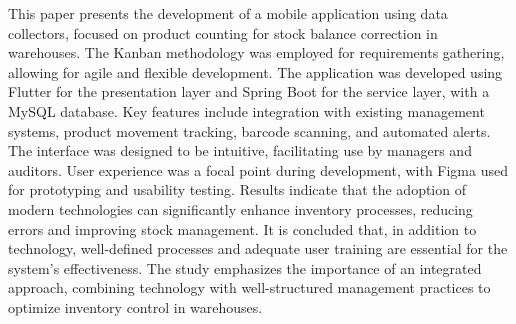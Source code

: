 This paper presents the development of a mobile application using data collectors, focused on product counting for stock balance correction in warehouses. The Kanban methodology was employed for requirements gathering, allowing for agile and flexible development. The application was developed using Flutter for the presentation layer and Spring Boot for the service layer, with a MySQL database. Key features include integration with existing management systems, product movement tracking, barcode scanning, and automated alerts. The interface was designed to be intuitive, facilitating use by managers and auditors. User experience was a focal point during development, with Figma used for prototyping and usability testing. Results indicate that the adoption of modern technologies can significantly enhance inventory processes, reducing errors and improving stock management. It is concluded that, in addition to technology, well-defined processes and adequate user training are essential for the system’s effectiveness. The study emphasizes the importance of an integrated approach, combining technology with well-structured management practices to optimize inventory control in warehouses.

